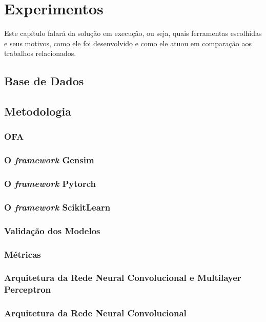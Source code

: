 \chapter{Experimentos}\label{chp:EXPERIMENTOS}

Este capítulo falará da solução em execução, ou seja, quais ferramentas escolhidas e seus motivos, como ele foi desenvolvido e como ele atuou em comparação aos trabalhos relacionados.

\section{Base de Dados}


\section{Metodologia}
\subsection{OFA}
\subsection{O \textit{framework} Gensim}
\subsection{O \textit{framework} Pytorch}
\subsection{O \textit{framework} ScikitLearn}
\subsection{Validação dos Modelos}
\subsection{Métricas}
\subsection{Arquitetura da Rede Neural Convolucional e Multilayer Perceptron}
\subsection{Arquitetura da Rede Neural Convolucional}
